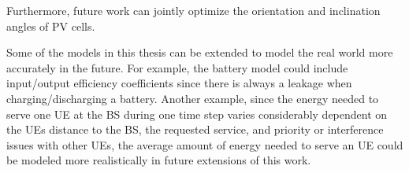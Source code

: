 Furthermore, future work can jointly optimize the orientation and inclination angles of PV cells.



Some of the models in this thesis can be extended to model the real world more accurately in the future. For example, the battery model could include input/output efficiency coefficients since there is always a leakage when charging/discharging a battery. Another example, since the energy needed to serve one UE at the BS during one time step varies considerably dependent on the UEs distance to the BS, the requested service, and priority or interference issues with other UEs, the average amount of energy needed to serve an UE could be modeled more realistically in future extensions of this work.   




